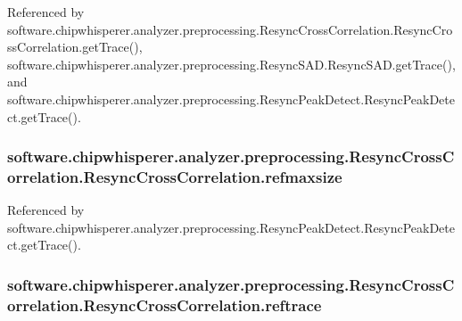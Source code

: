 Referenced by software.\+chipwhisperer.\+analyzer.\+preprocessing.\+Resync\+Cross\+Correlation.\+Resync\+Cross\+Correlation.\+get\+Trace(), software.\+chipwhisperer.\+analyzer.\+preprocessing.\+Resync\+S\+A\+D.\+Resync\+S\+A\+D.\+get\+Trace(), and software.\+chipwhisperer.\+analyzer.\+preprocessing.\+Resync\+Peak\+Detect.\+Resync\+Peak\+Detect.\+get\+Trace().

\hypertarget{classsoftware_1_1chipwhisperer_1_1analyzer_1_1preprocessing_1_1ResyncCrossCorrelation_1_1ResyncCrossCorrelation_a9f1de425aea20cb2d8727f0b7ef68a48}{}
\subsubsection[{refmaxsize}]{\setlength{\rightskip}{0pt plus 5cm}software.\+chipwhisperer.\+analyzer.\+preprocessing.\+Resync\+Cross\+Correlation.\+Resync\+Cross\+Correlation.\+refmaxsize}\label{classsoftware_1_1chipwhisperer_1_1analyzer_1_1preprocessing_1_1ResyncCrossCorrelation_1_1ResyncCrossCorrelation_a9f1de425aea20cb2d8727f0b7ef68a48}


Referenced by software.\+chipwhisperer.\+analyzer.\+preprocessing.\+Resync\+Peak\+Detect.\+Resync\+Peak\+Detect.\+get\+Trace().

\hypertarget{classsoftware_1_1chipwhisperer_1_1analyzer_1_1preprocessing_1_1ResyncCrossCorrelation_1_1ResyncCrossCorrelation_aaf4a2af4ddd3499398f6e2cd162f3cf7}{}
\subsubsection[{reftrace}]{\setlength{\rightskip}{0pt plus 5cm}software.\+chipwhisperer.\+analyzer.\+preprocessing.\+Resync\+Cross\+Correlation.\+Resync\+Cross\+Correlation.\+reftrace}\label{classsoftware_1_1chipwhisperer_1_1analyzer_1_1preprocessing_1_1ResyncCrossCorrelation_1_1ResyncCrossCorrelation_aaf4a2af4ddd3499398f6e2cd162f3cf7}


